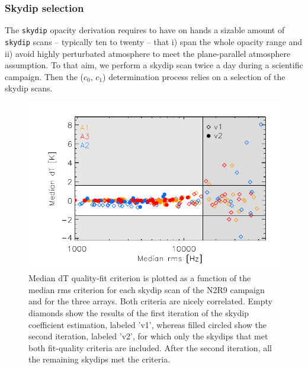\subsubsection{Skydip selection}
\label{se:skydip-selection}

The {\tt skydip} opacity derivation requires to have on hands a
sizable amount of {\tt skydip} scans --
typically ten to twenty -- that i) span the whole opacity range and
ii) avoid highly perturbated atmosphere to meet the plane-parallel
atmosphere assumption. To that aim, we perform a skydip
scan twice a day during a scientific campaign. Then the ($c_0$, $c_1$)
determination process relies on a selection of the skydip scans.
%
\begin{figure}[!htbp]
\begin{center}
\includegraphics[clip=true,width=\linewidth]{Figures/plot_skydip_selection_two_crit.pdf}
\caption[N2R9 skydip scan selection.]{ Median dT quality-fit criterion
is plotted as a function of the median rms criterion for each skydip
scan of the N2R9 campaign and for the three arrays. Both criteria are
nicely correlated. Empty diamonds show the results of the first
iteration of the skydip coefficient estimation, labeled 'v1', whereas
filled circled show the second iteration, labeled 'v2', for which only the skydips
that met both fit-quality criteria are included.
After the second iteration, all the remaining skydips met the criteria.}
\label{fig:skydipselection}
\end{center}
\end{figure}

